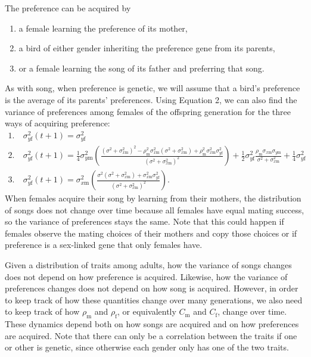 \documentclass{article}
\newcommand{\x}[1]{\text{#1}}
\begin{document}
The preference can be acquired by 
\begin{enumerate}
\item a female learning the preference of its mother,
\item a bird of either gender inheriting the preference gene from its parents,
\item or a female learning the song of its father and preferring that song.
\end{enumerate}
As with song, when preference is genetic, we will assume that a bird's preference is the average of its parents' preferences. Using Equation 2, we can also find the variance of preferences among females of the offspring generation for the three ways of acquiring preference:
\begin{align*}
1. \ & \sigma_{y\x{f}}^2(t+1) = \sigma_{y\x{f}}^2
\\2. \ & \sigma_{y\x{f}}^2(t+1) = \frac{1}{4}\sigma_{y\x{m}}^2\left(\frac{(\sigma^2+\sigma_{x\x{m}}^2)^2-\rho_\x{m}^2\sigma_{x\x{m}}^2(\sigma^2+\sigma_{x\x{m}}^2)+\rho_\x{m}^2\sigma_{x\x{m}}^2\sigma_{y\x{f}}^2}{(\sigma^2+\sigma_{x\x{m}}^2)^2}\right)+\frac{1}{2}\sigma_{y\x{f}}^2\frac{\rho_\x{m}\sigma_{x\x{m}}\sigma_{y\x{m}}}{\sigma^2+\sigma_{x\x{m}}^2}+\frac{1}{4}\sigma_{y\x{f}}^2
\\3. \ & \sigma_{y\x{f}}^2(t+1) = \sigma_{x\x{m}}^2\left(\frac{\sigma^2(\sigma^2+\sigma_{x\x{m}}^2)+\sigma_{ x\x{m}}^2\sigma_{y\x{f}}^2}{(\sigma^2+\sigma_{x\x{m}}^2)^2}\right).
\end{align*}
When females acquire their song by learning from their mothers, the distribution of songs does not change over time because all females have equal mating success, so the variance of preferences stays the same. Note that this could happen if females observe the mating choices of their mothers and copy those choices or if preference is a sex-linked gene that only females have. 

Given a distribution of traits among adults, how the variance of songs changes does not depend on how preference is acquired. Likewise, how the variance of preferences changes does not depend on how song is acquired. However, in order to keep track of how these quantities change over many generations, we also need to keep track of how $\rho_\x{m}$ and $\rho_\x{f}$, or equivalently $C_\x{m}$ and $C_\x{f}$, change over time. These dynamics depend both on how songs are acquired and on how preferences are acquired. Note that there can only be a correlation between the traits if one or other is genetic, since otherwise each gender only has one of the two traits.
\end{document}
